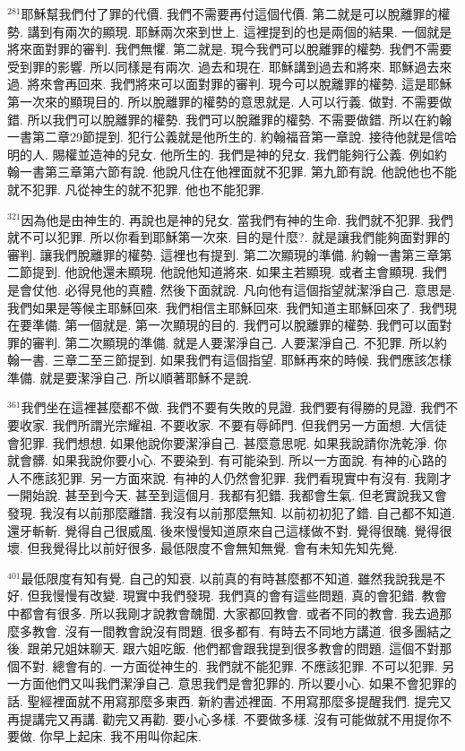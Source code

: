\documentclass{book}
\begin{document}
$^{281}$耶穌幫我們付了罪的代價.
我們不需要再付這個代價.
第二就是可以脫離罪的權勢.
講到有兩次的顯現.
耶穌兩次來到世上.
這裡提到的也是兩個的結果.
一個就是將來面對罪的審判.
我們無懼.
第二就是.
現今我們可以脫離罪的權勢.
我們不需要受到罪的影響.
所以同樣是有兩次.
過去和現在.
耶穌講到過去和將來.
耶穌過去來過.
將來會再回來.
我們將來可以面對罪的審判.
現今可以脫離罪的權勢.
這是耶穌第一次來的顯現目的.
所以脫離罪的權勢的意思就是.
人可以行義.
做對.
不需要做錯.
所以我們可以脫離罪的權勢.
我們可以脫離罪的權勢.
不需要做錯.
所以在約翰一書第二章29節提到.
犯行公義就是他所生的.
約翰福音第一章說.
接待他就是信哈明的人.
賜權並造神的兒女.
他所生的.
我們是神的兒女.
我們能夠行公義.
例如約翰一書第三章第六節有說.
他說凡住在他裡面就不犯罪.
第九節有說.
他說他也不能就不犯罪.
凡從神生的就不犯罪.
他也不能犯罪.

$^{321}$因為他是由神生的.
再說也是神的兒女.
當我們有神的生命.
我們就不犯罪.
我們就不可以犯罪.
所以你看到耶穌第一次來.
目的是什麼?.
就是讓我們能夠面對罪的審判.
讓我們脫離罪的權勢.
這裡也有提到.
第二次顯現的準備.
約翰一書第三章第二節提到.
他說他還未顯現.
他說他知道將來.
如果主若顯現.
或者主會顯現.
我們是會仗他.
必得見他的真體.
然後下面就說.
凡向他有這個指望就潔淨自己.
意思是.
我們如果是等候主耶穌回來.
我們相信主耶穌回來.
我們知道主耶穌回來了.
我們現在要準備.
第一個就是.
第一次顯現的目的.
我們可以脫離罪的權勢.
我們可以面對罪的審判.
第二次顯現的準備.
就是人要潔淨自己.
人要潔淨自己.
不犯罪.
所以約翰一書.
三章二至三節提到.
如果我們有這個指望.
耶穌再來的時候.
我們應該怎樣準備.
就是要潔淨自己.
所以順著耶穌不是說.

$^{361}$我們坐在這裡甚麼都不做.
我們不要有失敗的見證.
我們要有得勝的見證.
我們不要收家.
我們所謂光宗耀祖.
不要收家.
不要有辱師門.
但我們另一方面想.
大信徒會犯罪.
我們想想.
如果他說你要潔淨自己.
甚麼意思呢.
如果我說請你洗乾淨.
你就會髒.
如果我說你要小心.
不要染到.
有可能染到.
所以一方面說.
有神的心路的人不應該犯罪.
另一方面來說.
有神的人仍然會犯罪.
我們看現實中有沒有.
我剛才一開始說.
甚至到今天.
甚至到這個月.
我都有犯錯.
我都會生氣.
但老實說我又會發現.
我沒有以前那麼離譜.
我沒有以前那麼無知.
以前初初犯了錯.
自己都不知道.
還牙斬斬.
覺得自己很威風.
後來慢慢知道原來自己這樣做不對.
覺得很醜.
覺得很壞.
但我覺得比以前好很多.
最低限度不會無知無覺.
會有未知先知先覺.

$^{401}$最低限度有知有覺.
自己的知衰.
以前真的有時甚麼都不知道.
雖然我說我是不好.
但我慢慢有改變.
現實中我們發現.
我們真的會有這些問題.
真的會犯錯.
教會中都會有很多.
所以我剛才說教會醜聞.
大家都回教會.
或者不同的教會.
我去過那麼多教會.
沒有一間教會說沒有問題.
很多都有.
有時去不同地方講道.
很多團結之後.
跟弟兄姐妹聊天.
跟六姐吃飯.
他們都會跟我提到很多教會的問題.
這個不對那個不對.
總會有的.
一方面從神生的.
我們就不能犯罪.
不應該犯罪.
不可以犯罪.
另一方面他們又叫我們潔淨自己.
意思我們是會犯罪的.
所以要小心.
如果不會犯罪的話.
聖經裡面就不用寫那麼多東西.
新約書述裡面.
不用寫那麼多提醒我們.
提完又再提講完又再講.
勸完又再勸.
要小心多樣.
不要做多樣.
沒有可能做就不用提你不要做.
你早上起床.
我不用叫你起床.
\end{document}
